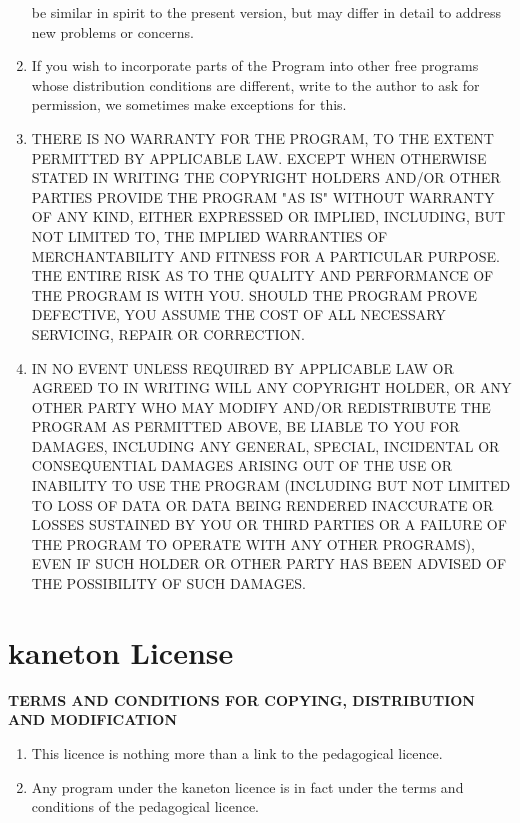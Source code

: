 \begin{enumerate}
    be similar in spirit to the present version, but may differ in
    detail to address new problems or concerns.
  \item
    If you wish to incorporate parts of the Program into other free
    programs whose distribution conditions are different, write to the
    author to ask for permission, we sometimes make exceptions for this.
  \item
    THERE IS NO WARRANTY FOR THE PROGRAM, TO THE EXTENT PERMITTED BY
    APPLICABLE LAW. EXCEPT WHEN OTHERWISE STATED IN WRITING THE
    COPYRIGHT HOLDERS AND/OR OTHER PARTIES PROVIDE THE PROGRAM "AS IS"
    WITHOUT WARRANTY OF ANY KIND, EITHER EXPRESSED OR IMPLIED,
    INCLUDING, BUT NOT LIMITED TO, THE IMPLIED WARRANTIES OF
    MERCHANTABILITY AND FITNESS FOR A PARTICULAR PURPOSE. THE ENTIRE
    RISK AS TO THE QUALITY AND PERFORMANCE OF THE PROGRAM IS WITH
    YOU. SHOULD THE PROGRAM PROVE DEFECTIVE, YOU ASSUME THE COST OF
    ALL NECESSARY SERVICING, REPAIR OR CORRECTION.
  \item
    IN NO EVENT UNLESS REQUIRED BY APPLICABLE LAW OR AGREED TO IN
    WRITING WILL ANY COPYRIGHT HOLDER, OR ANY OTHER PARTY WHO MAY
    MODIFY AND/OR REDISTRIBUTE THE PROGRAM AS PERMITTED ABOVE, BE
    LIABLE TO YOU FOR DAMAGES, INCLUDING ANY GENERAL, SPECIAL,
    INCIDENTAL OR CONSEQUENTIAL DAMAGES ARISING OUT OF THE USE OR
    INABILITY TO USE THE PROGRAM (INCLUDING BUT NOT LIMITED TO LOSS OF
    DATA OR DATA BEING RENDERED INACCURATE OR LOSSES SUSTAINED BY YOU
    OR THIRD PARTIES OR A FAILURE OF THE PROGRAM TO OPERATE WITH ANY
    OTHER PROGRAMS), EVEN IF SUCH HOLDER OR OTHER PARTY HAS BEEN
    ADVISED OF THE POSSIBILITY OF SUCH DAMAGES.
\end{enumerate}

%
%

\section{kaneton License}

\textbf{TERMS AND CONDITIONS FOR COPYING, DISTRIBUTION AND MODIFICATION}

\begin{enumerate}
  \item
    This licence is nothing more than a link to the pedagogical licence.
  \item
    Any program under the kaneton licence is in fact under the terms and
    conditions of the pedagogical licence.
\end{enumerate}
